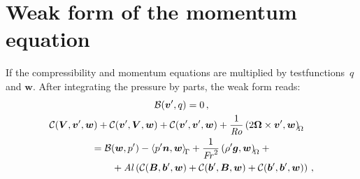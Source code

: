 \section{Weak form of the momentum equation}
If the compressibility and momentum equations are multiplied by testfunctions~$q$ and $\bm{w}$. After integrating the pressure by parts, the weak form reads:
\begin{gather}
	\saddle{\bm{v}'}{q}=0\,,\label{eqn:WeakIncompressibility} \\
	\begin{multlined}
	\convec{\bm{V}}{\bm{v}'}{\bm{w}}+\convec{\bm{v}'}{\bm{V}}{\bm{w}}+\convec{\bm{v}'}{\bm{v}'}{\bm{w}}+\frac{1}{\Rossby}\inner{2\bm{\Omega}\times\bm{v}'}{\bm{w}}\\
	=\saddle{\bm{w}}{p'}-\innerSurf{p'\bm{n}}{\bm{w}}+\frac{1}{\Froude^2}\inner{\rho'\bm{g}}{\bm{w}}+{}\\
	{}+\Alfven\left(\convec{\bm{B}}{\bm{b}'}{\bm{w}}+\convec{\bm{b}'}{\bm{B}}{\bm{w}}+\convec{\bm{b}'}{\bm{b}'}{\bm{w}}\right)\,,
	\end{multlined}\label{eqn:WeakMomentum}
\end{gather}

